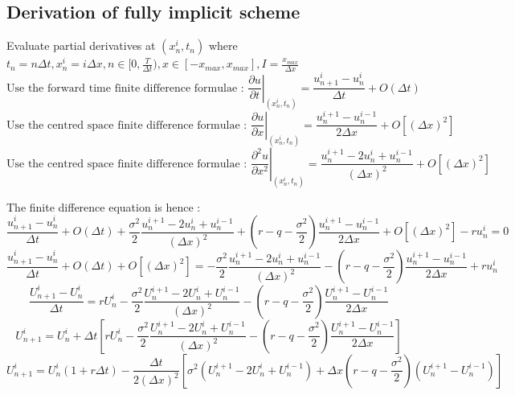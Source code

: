 \subsection{Derivation of fully implicit scheme}
Evaluate partial derivatives at $(x_{n}^{i}, t_{n})$ where $t_{n} = n\Delta t, x_{n}^{i} = i\Delta x, n \in [0, \frac{T}{\Delta t}), x \in [-x_{max}, x_{max}], I = \frac{x_{max}}{\Delta x}$
$$ \text{Use the forward time finite difference formulae : } \left. \frac{\partial u}{\partial t} \right| _{(x_{n}^{i}, t_{n})} = \frac{u_{n+1}^{i} - u_{n}^{i}}{\Delta t} + O(\Delta t)$$
$$ \text{Use the centred space finite difference formulae : } \left. \frac{\partial u}{\partial x} \right| _{(x_{n}^{i}, t_{n})} = \frac{u_{n}^{i+1} - u_{n}^{i-1}}{2\Delta x} + O[(\Delta x)^{2}]$$
$$ \text{Use the centred space finite difference formulae : } \left. \frac{\partial^{2} u}{\partial x^{2}} \right| _{(x_{n}^{i}, t_{n})} = \frac{u_{n}^{i+1} - 2u_{n}^{i} + u_{n}^{i-1}}{(\Delta x)^{2}} + O[(\Delta x)^{2}]$$

The finite difference equation is hence : 
$$ \frac{u_{n+1}^{i} - u_{n}^{i}}{\Delta t} + O(\Delta t) + \frac{\sigma ^ {2}}{2}\frac{u_{n}^{i+1} -2u_{n}^{i} + u_{n}^{i-1}}{(\Delta x)^{2}} + (r - q - \frac{\sigma^{2}}{2})\frac{u_{n}^{i+1} - u_{n}^{i-1}}{2\Delta x} + O[(\Delta x)^{2}] -ru_{n}^{i} = 0$$
$$ \frac{u_{n+1}^{i} - u_{n}^{i}}{\Delta t} + O(\Delta t) + O[(\Delta x)^{2}] = -\frac{\sigma ^ {2}}{2}\frac{u_{n}^{i+1} -2u_{n}^{i} + u_{n}^{i-1}}{(\Delta x)^{2}} - (r - q - \frac{\sigma^{2}}{2})\frac{u_{n}^{i+1} - u_{n}^{i-1}}{2\Delta x} + ru_{n}^{i}$$
$$ \frac{U_{n+1}^{i} - U_{n}^{i}}{\Delta t} = rU_{n}^{i} - \frac{\sigma ^ {2}}{2}\frac{U_{n}^{i+1} -2U_{n}^{i} + U_{n}^{i-1}}{(\Delta x)^{2}} - (r - q - \frac{\sigma^{2}}{2})\frac{U_{n}^{i+1} - U_{n}^{i-1}}{2\Delta x}$$
$$ U_{n+1}^{i} = U_{n}^{i} + \Delta t[rU_{n}^{i} - \frac{\sigma ^ {2}}{2}\frac{U_{n}^{i+1} -2U_{n}^{i} + U_{n}^{i-1}}{(\Delta x)^{2}} - (r - q - \frac{\sigma^{2}}{2})\frac{U_{n}^{i+1} - U_{n}^{i-1}}{2\Delta x}]$$
$$ U_{n+1}^{i} = U_{n}^{i} (1+ r \Delta t) - \frac{\Delta t}{2(\Delta x)^{2}}[\sigma ^ {2}(U_{n}^{i+1} -2U_{n}^{i} + U_{n}^{i-1}) + \Delta x(r - q - \frac{\sigma^{2}}{2})(U_{n}^{i+1} - U_{n}^{i-1})]$$


